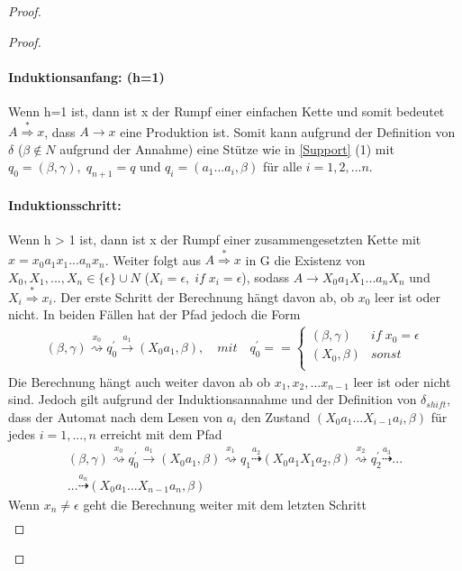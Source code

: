 \begin{proof}
\begin{proof}
\paragraph*{Induktionsanfang: (h=1)}
Wenn h=1 ist, dann ist x der Rumpf einer einfachen Kette und somit bedeutet $A \stackrel{*} {\Rightarrow} x$, dass $A \rightarrow x$ eine Produktion ist. Somit kann aufgrund der Definition von $\delta$ ($\beta \notin N$ aufgrund der Annahme) eine Stütze wie in \autoref{Support} (1) mit $q_0=(\beta, \gamma), \; q_{n+1}=q$ und $q_i=(a_1...a_i, \beta)$ für alle $i=1,2,...n$.
\paragraph*{Induktionsschritt:}
Wenn h > 1 ist, dann ist x der Rumpf einer zusammengesetzten Kette mit $x=x_0a_1x_1...a_nx_n$. Weiter folgt aus $A\stackrel{*}{\Rightarrow}x$ in G die Existenz von $X_0, X_1, ...,X_n \in \{\epsilon\}\cup N$ ($X_i = \epsilon, \; if \; x_i=\epsilon$), sodass $A\rightarrow X_0a_1X_1...a_nX_n$ und $X_i \stackrel{*}{\Rightarrow}x_i$. Der erste Schritt der Berechnung hängt davon ab, ob $x_0$ leer ist oder nicht. In beiden Fällen hat der Pfad jedoch die Form
\begin{eqnarray*}
(\beta, \gamma) \stackrel{x_0}{\rightsquigarrow} q_0^\prime \stackrel{a_1}{\rightarrow} (X_0a_1, \beta), \quad mit \quad q_0^\prime= = \begin{cases}
(\beta, \gamma) & if \; x_0 = \epsilon \\
(X_0, \beta) & sonst \\
\end{cases}
\end{eqnarray*}
Die Berechnung hängt auch weiter davon ab ob $x_1, x_2,...x_{n-1}$ leer ist oder nicht sind. Jedoch gilt aufgrund der Induktionsannahme und der Definition von $\delta_{shift}$, dass der Automat nach dem Lesen von $a_i$ den Zustand $(X_0a_1...X_{i-1}a_i, \beta)$ für jedes $i=1,...,n$ erreicht mit dem Pfad 
\begin{multline*}
(\beta, \gamma) \stackrel{x_0}{\rightsquigarrow} q_0^\prime \stackrel{a_1}{\rightarrow} (X_0a_1, \beta) \stackrel{x_1}{\rightsquigarrow}q_1 \stackrel{a_2}{\dashrightarrow}(X_0a_1X_1a_2, \beta) \stackrel{x_2}{\rightsquigarrow} q_2^\prime \stackrel{a_3}{\dashrightarrow}... \\
...\stackrel{a_n}{\dashrightarrow} (X_0a_1...X_{n-1}a_n, \beta)
\end{multline*}
Wenn $x_n \neq \epsilon$ geht die Berechnung weiter mit dem letzten Schritt
\begin{eqnarray*}

\end{eqnarray*}
\end{proof}
\end{proof}
